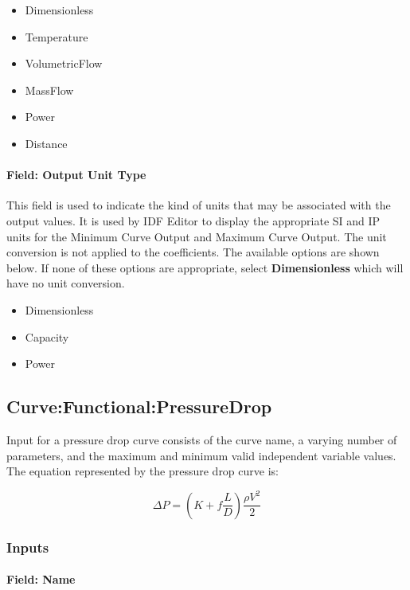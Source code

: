\begin{itemize}
\item
  Dimensionless
\item
  Temperature
\item
  VolumetricFlow
\item
  MassFlow
\item
  Power
\item
  Distance
\end{itemize}

\paragraph{Field: Output Unit Type}\label{field-output-unit-type-10}

This field is used to indicate the kind of units that may be associated with the output values. It is used by IDF Editor to display the appropriate SI and IP units for the Minimum Curve Output and Maximum Curve Output. The unit conversion is not applied to the coefficients. The available options are shown below. If none of these options are appropriate, select \textbf{Dimensionless} which will have no unit conversion.

\begin{itemize}
\item
  Dimensionless
\item
  Capacity
\item
  Power
\end{itemize}

\subsection{Curve:Functional:PressureDrop}\label{curvefunctionalpressuredrop}

Input for a pressure drop curve consists of the curve name, a varying number of parameters, and the maximum and minimum valid independent variable values. The equation represented by the pressure drop curve is:

\begin{equation}
\Delta P = \left( {K + f\frac{L}{D}} \right)\frac{{\rho {V^2}}}{2}
\end{equation}

\subsubsection{Inputs}\label{inputs-11-010}

\paragraph{Field: Name}\label{field-name-11-009}

